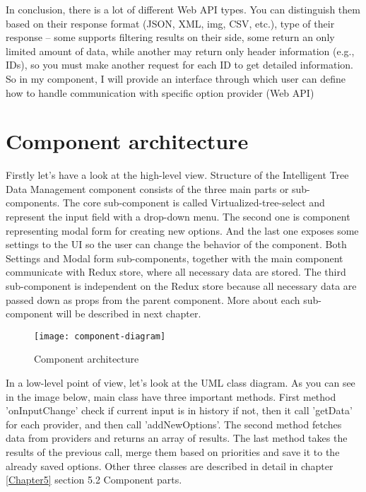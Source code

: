 \bigskip

In conclusion, there is a lot of different Web API types. You can distinguish them based on their response format (JSON, XML, img, CSV, etc.), type of their response – some supports filtering results on their side, some return an only limited amount of data, while another may return only header information (e.g., IDs), so you must make another request for each ID to get detailed information. 
So in my component, I will provide an interface through which user can define how to handle communication with specific option provider (Web API)



\section{Component architecture}

Firstly let's have a look at the high-level view. Structure of the Intelligent Tree Data Management component consists of the three main parts or sub-components. The core sub-component is called Virtualized-tree-select and represent the input field with a drop-down menu. The second one is component representing modal form for creating new options. And the last one exposes some settings to the UI so the user can change the behavior of the component. Both Settings and Modal form sub-components, together with the main component communicate with Redux store, where all necessary data are stored. The third sub-component is independent on the Redux store because all necessary data are passed down as props from the parent component. More about each sub-component will be described in next chapter.

\begin{figure}[th]
    \centering
    \texttt{[image: component-diagram]}
    \decoRule
    \caption[Architecture]{Component architecture}
    \label{fig:structure}
 \end{figure}

In a low-level point of view, let's look at the UML \parencite{uml} class diagram. As you can see in the image below, main class have three important methods. First method 'onInputChange' check if current input is in history if not, then it call 'getData' for each provider,  and then call 'addNewOptions'. The second method fetches data from providers and returns an array of results. The last method takes the results of the previous call, merge them based on priorities and save it to the already saved options. Other three classes are described in detail in chapter \ref{Chapter5} section 5.2 Component parts. 

